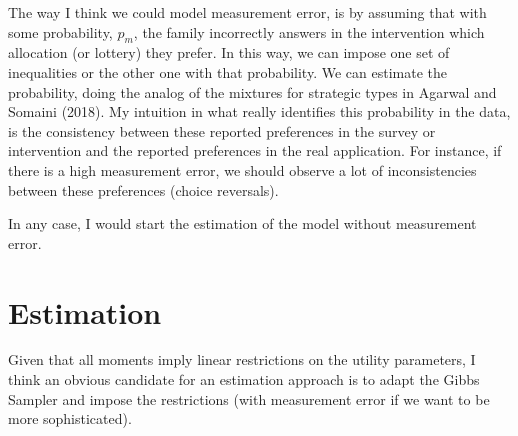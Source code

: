\documentclass{article}
\begin{document}
The way I think we could model measurement error, is by assuming that with some probability, $p_m$, the family incorrectly answers in the intervention which allocation (or lottery) they prefer. In this way, we can impose one set of inequalities or the other one with that probability. We can estimate the probability, doing the analog of the mixtures for strategic types in Agarwal and Somaini (2018). My intuition in what really identifies this probability in the data, is the consistency between these reported preferences in the survey or intervention and the reported preferences in the real application. For instance, if there is a high measurement error, we should observe a lot of inconsistencies between these preferences (choice reversals).

In any case, I would start the estimation of the model without measurement error.

\section{Estimation}

Given that all moments imply linear restrictions on the utility parameters, I think an obvious candidate for an estimation approach is to adapt the Gibbs Sampler and impose the restrictions (with measurement error if we want to be more sophisticated).
\end{document}
